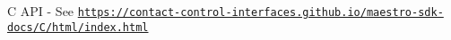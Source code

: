 C A\+PI -\/ See \href{https://contact-control-interfaces.github.io/maestro-sdk-docs/C/html/index.html}{\tt https\+://contact-\/control-\/interfaces.\+github.\+io/maestro-\/sdk-\/docs/\+C/html/index.\+html} 